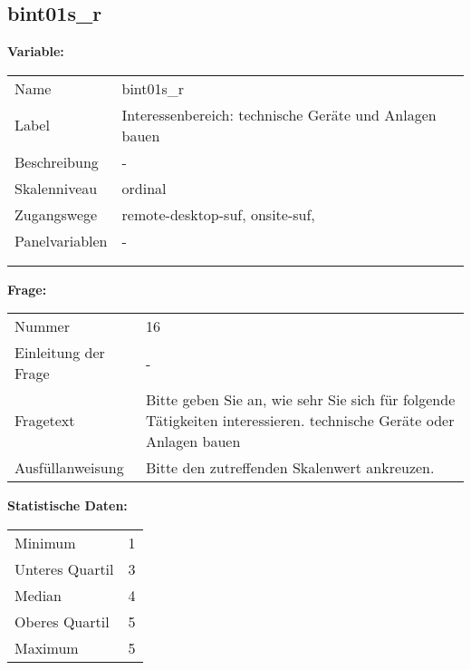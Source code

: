 	
	
	\subsection{bint01s\_r}
	\label{subSection:bint01s_r}

	\noindent\textbf{Variable:}\\
		\begin{tabular}{lL{11.3cm}}
			\label{tableVariable:bint01s_r}
			Name & bint01s\_r \\
			Label & Interessenbereich: technische Geräte und Anlagen bauen \\
			Beschreibung & - \\
			Skalenniveau & ordinal \\
			Zugangswege &
				remote-desktop-suf,
				onsite-suf,
 \\
			Panelvariablen & -
			 \\
			 \\
 \\
		\end{tabular}

		\vspace*{1 cm}
		\noindent\textbf{Frage:}\\
		\begin{tabular}{lL{11.3cm}}
			\label{tableQuestion:bint01s_r}
			Nummer & 16 \\
			Einleitung der Frage & - \\
			Fragetext & Bitte geben Sie an, wie sehr Sie sich für folgende Tätigkeiten interessieren.
technische Geräte oder Anlagen bauen \\
			Ausfüllanweisung & Bitte den zutreffenden Skalenwert ankreuzen. \\
		\end{tabular}


		\vspace*{1 cm}
		\noindent\textbf{Statistische Daten:}\\
			\begin{tabular}{ll}
				\label{tableStatistics:bint01s_r}
					Minimum & 1 \\
					Unteres Quartil & 3 \\
					Median & 4 \\
					Oberes Quartil & 5 \\
					Maximum & 5 \\
			\end{tabular}




